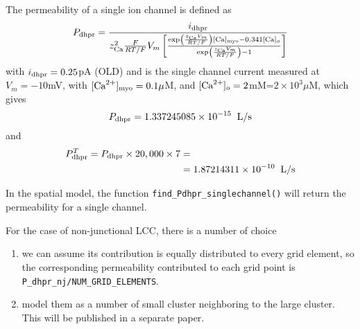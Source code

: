 The permeability of a single ion channel is defined as
\begin{equation}
  \label{eq:41}
  P_{\text{dhpr}} = \frac{i_{\text{dhpr}}}{z_{\text{Ca}} ^2 \frac{F}{RT/F}V_m
      \left[\frac{\exp\left(\frac{z_{\text{Ca}} V_m}{RT/F}\right)[{\text{Ca}}]_{\text{myo}}-0.341[{\text{Ca}}]_o}{\exp\left(\frac{z_{\text{Ca}} V_m}{RT/F}\right)
          - 1} \right]} 
\end{equation}
with $i_{\text{dhpr}}=0.25$pA (OLD) and  is the single channel current measured at
$V_m=-10$mV, with $[{\text{Ca}^{2+}}]_{\text{myo}}=0.1\mu$M, and
$[{\text{Ca}^{2+}}]_o=2$mM=$2\times10^3\mu$M, which gives
\begin{equation}
  \label{eq:43}
  P_{\text{dhpr}} = 1.337245085\times 10^{-15} \;\; \text{L/s}
\end{equation}
and
\begin{equation}
  \label{eq:42}
  \begin{split}
      P_{\text{dhpr}}^T=P_{\text{dhpr}}\times 20,000 \times 7 &= \\
  &= 1.87214311\times 10^{-10} \;\;\text{L/s}
  \end{split}
\end{equation}

In the spatial model, the function \verb!find_Pdhpr_singlechannel()! will return
the permeability for a single channel. 

% 
% 
% 
For the case of non-junctional LCC, there is a number of choice 
\begin{enumerate}
  \item we can assume its contribution is equally
distributed to every grid element, so the corresponding
permeability contributed to each grid point is
\verb!P_dhpr_nj/NUM_GRID_ELEMENTS!. 
  \item  model them as a number of small cluster neighboring to the large
  cluster. This will be published in a separate paper. 
\end{enumerate}


